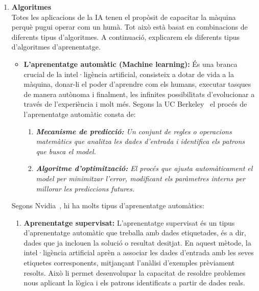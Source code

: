 \begin{enumerate}
    \item \textbf{Algoritmes}\\
    Totes les aplicacions de la IA tenen el propòsit de capacitar la màquina perquè pugui operar com un humà. Tot això està basat en combinacions de diferents tipus d'algoritmes. A continuació, explicarem els diferents tipus d'algoritmes d'aprenentatge.
    \begin{itemize}
        \item \textbf{L'aprenentatge automàtic (Machine learning):}\label{Aprenentatge_automàtic}
        És una branca crucial de la intel·ligència artificial, consisteix a dotar de vida a la màquina, donar-li el poder d'aprendre com els humans, executar tasques de manera autònoma i finalment, les infinites possibilitats d'evolucionar a través de l'experiència i molt més. Segons la UC Berkeley~\cite{Berkeley} el procés de l'aprenentatge automàtic consta de:
        \begin{enumerate}
            \item \textit{\textbf{Mecanisme de predicció:} Un conjunt de regles o operacions matemàtics que analitza les dades d'entrada i identifica els patrons que busca el model.}
            \item \textit{\textbf{Algoritme d'optimització:} El procés que ajusta automàticament el model per minimitzar l'error, modificant els paràmetres interns per millorar les prediccions futures.}
        \end{enumerate}
    \end{itemize}

    Segons Nvidia~\cite{Nvidia}, hi ha molts tipus d'aprenentatge automàtics:
    \begin{enumerate}
        \item \textbf{Aprenentatge supervisat:}
        L'aprenentatge supervisat és un tipus d'aprenentatge automàtic que treballa amb dades etiquetades, és a dir, dades que ja inclouen la solució o resultat desitjat. En aquest mètode, la intel·ligència artificial aprèn a associar les dades d'entrada amb les seves etiquetes corresponents, mitjançant l'anàlisi d'exemples prèviament resolts. Això li permet desenvolupar la capacitat de resoldre problemes nous aplicant la lògica i els patrons identificats a partir de dades reals.


\end{enumerate}
\end{enumerate}

